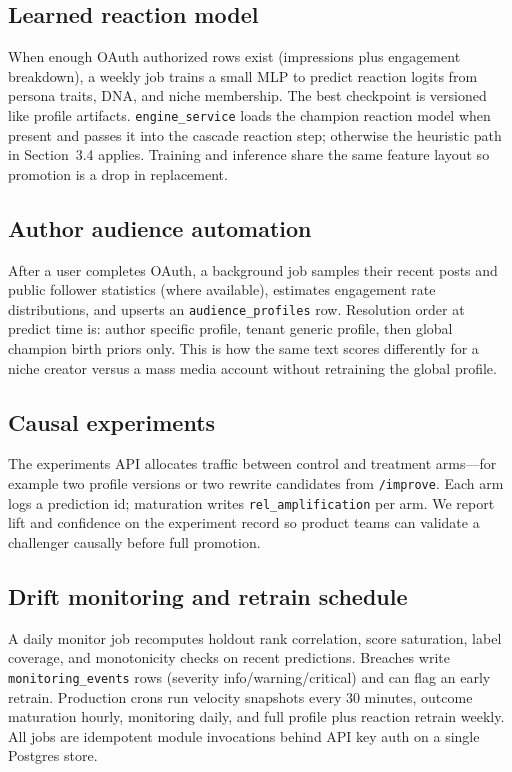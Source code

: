 \documentclass[11pt]{article}
\begin{document}
\subsection{Learned reaction model}
\label{sec:reaction-mlp}
When enough OAuth authorized rows exist (impressions plus engagement breakdown),
a weekly job trains a small MLP to predict reaction logits from persona traits,
DNA, and niche membership. The best checkpoint is versioned like profile
artifacts. \texttt{engine\_service} loads the champion reaction model when
present and passes it into the cascade reaction step; otherwise the heuristic
path in Section~3.4 applies. Training and inference share the same feature
layout so promotion is a drop in replacement.

\subsection{Author audience automation}
After a user completes OAuth, a background job samples their recent posts and
public follower statistics (where available), estimates engagement rate
distributions, and upserts an \texttt{audience\_profiles} row. Resolution order
at predict time is: author specific profile, tenant generic profile, then global
champion birth priors only. This is how the same text scores differently for a
niche creator versus a mass media account without retraining the global profile.

\subsection{Causal experiments}
The experiments API allocates traffic between control and treatment arms---for
example two profile versions or two rewrite candidates from \texttt{/improve}.
Each arm logs a prediction id; maturation writes \texttt{rel\_amplification} per
arm. We report lift and confidence on the experiment record so product teams can
validate a challenger causally before full promotion.

\subsection{Drift monitoring and retrain schedule}
A daily monitor job recomputes holdout rank correlation, score saturation, label
coverage, and monotonicity checks on recent predictions. Breaches write
\texttt{monitoring\_events} rows (severity info/warning/critical) and can flag
an early retrain. Production crons run velocity snapshots every 30 minutes,
outcome maturation hourly, monitoring daily, and full profile plus reaction
retrain weekly. All jobs are idempotent module invocations behind API key auth
on a single Postgres store.
\end{document}
